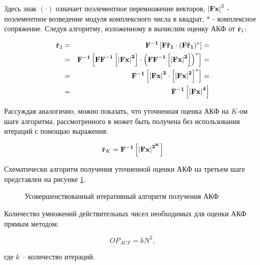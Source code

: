 Здесь знак ${(\cdot)}$  означает поэлементное перемножение векторов, ${\left| \bf{Fx} \right| ^2}$ - поэлементное возведение модуля комплексного числа в квадрат, ${*}$ -
комплексное сопряжение.  Следуя алгоритму, изложенному в \cite{ostanin_akf} вычислим оценку АКФ от ${\hat{\bf{r}}_1}$:
\begin{center}
\begin{eqnarray}
	\label{eq:akf_2}
	\hat{\bf{r}}_2 & = & \bf{F}^{-1}\left[ \bf{F} \hat{\bf{r}}_1 \cdot (\bf{F} \hat{\bf{r}}_1)^* \right] = \nonumber \\
		& = & \bf{F}^{-1}	\left[ 
				\bf{FF}^{-1} \left[
						\left| \bf{Fx} \right| ^2
					\right]
						\cdot \left( \bf{FF}^{-1} \left[ \left| \bf{Fx} \right| ^2 \right]
					\right) ^*
			\right] = \nonumber \\
		& = & \bf{F}^{-1} \left[ \left| \bf{Fx} \right| ^2 \cdot \left[ \left| \bf{Fx} \right| ^2 \right] ^* \right] =  \nonumber \\
		& = & \bf{F}^{-1} \left[ \left| \bf{Fx} \right| ^4 \right]
\end{eqnarray}
\end{center}

Рассуждая аналогично, можно показать, что уточненная оценка АКФ на ${K}$-ом шаге алгоритма, рассмотренного в \cite{ostanin_akf}
может быть получена без использования итераций с помощью выражения:

\begin{center}
\begin{equation}
	\label{eq:akf_3}
	\hat{\bf{r}}_K = \bf{F}^{-1}\left[ \left| \bf{Fx} \right| ^{2^K} \right]
\end{equation}
\end{center}

Схематически алгоритм получения уточненной оценки АКФ на третьем шаге представлен на рисунке \ref{pic:akf_pic}.

\begin{figure}[H]
	\center{}
	\caption{Усовершенствованный итеративный алгоритм получения АКФ}
	\label{pic:akf_pic}
\end{figure}

Количество умножений действительных чисел необходимых для оценки АКФ прямым методом: 
\begin{center}
\begin{equation}
	\label{eq:num_of_op_acf}
	OP_{ACF}=kN^2,
\end{equation}
\end{center}
где ${k}$  – количество итераций.

